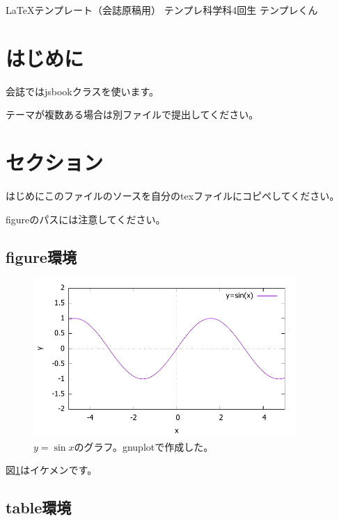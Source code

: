 \documentclass[10pt,b5paper,papersize,dvipdfmx]{jsbook}
\begin{document}


\kaishititle%
  {\LaTeX テンプレート（会誌原稿用）}%
  {テンプレ科学科4回生}%
  {テンプレくん}%

%
\section*{はじめに}
会誌ではjsbookクラスを使います。\par
テーマが複数ある場合は別ファイルで提出してください。

%
\section{セクション}
はじめにこのファイルのソースを自分のtexファイルにコピペしてください。\par
figureのパスには注意してください。


\clearpage
%
\subsection{figure環境}

\begin{figure}[htbp]
  \centering
  \includegraphics[width=10cm]{temp/fig-sin.pdf}
  \caption{$y=\sin x$のグラフ。gnuplotで作成した。}
  \label{fig:sin}
\end{figure}

図\ref{fig:sin}はイケメンです。

%
\subsection{table環境}
\end{document}
